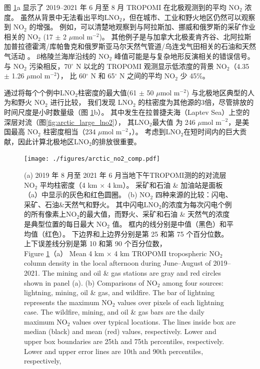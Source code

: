 图 \ref{fig:arctic_no2_comp}a 显示了 2019--2021 年 6 月至 8 月 TROPOMI 在北极观测到的平均 NO$_2$ 浓度。
虽然从背景中无法看出平均LNO$_2$，但在城市、工业和野火地区仍然可以观察到 NO$_2$ 的增强。
例如，可以清楚地观察到与阿拉斯加、挪威和俄罗斯的采矿作业相关的 NO$_2$ (17 $\pm$ 2 $\mu$mol m$^{-2}$)。
其他例子是与加拿大北极麦肯齐谷、北阿拉斯加普拉德霍湾/库帕鲁克和俄罗斯亚马尔天然气管道/乌连戈气田相关的石油和天然气活动 \citep{VanDerA.2020}。
ß格陵兰海岸沿线的 NO$_2$ 峰值可能是与复杂地形反演相关的错误信号\citep{Hachmeister.2022}。
与 NO$_2$ 污染相反，70$^{\circ}$ N 以北的 TROPOMI 观测显示低浓度的背景 NO$_2$（4.35 $\pm$ 1.26 $\mu$mol m$^{-2}$），
比 60$^{\circ}$ N 和 65$^{\circ}$ N 之间的平均 NO$_2$ 少 45\%。

通过将每个个例中LNO$_2$柱密度的最大值(61 $\pm$ 50 $\mu$mol m$^{-2}$) 与北极地区典型的人为和野火 NO$_2$ 进行比较，
我们发现 LNO$_2$ 的柱密度为其他源的3倍，尽管排放的时间尺度是小时数量级（图 \ref{fig:arctic_no2_comp}b）。
其中发生在拉普捷夫海（Laptev Sea）上空的深层对流（图\ref{fig:arctic_large_lno2}），
其LNO$_2$最大值 为 246 $\mu$mol m$^{-2}$，是美国最高 NO$_2$ 柱密度相当（234 $\mu$mol m$^{-2}$，\citet{Goldberg.2021a}）。
考虑到LNO$_2$在短时间内的巨大贡献，因此计算北极地区LNO$_2$的排放很重要。

\begin{figure}[!htbp]
\centering
\texttt{[image: ./figures/arctic\_no2\_comp.pdf]}
\caption{
(a) 2019 年 8 月至 2021 年 6 月当地下午TROPOMI测的的对流层 NO$_2$ 平均柱密度（4 km $\times$ 4 km）。
采矿和石油 \& 加油站是面板（a）中显示的灰色和红色圆圈。
(b) NO$_2$ 四种来源的比较：闪电、采矿、石油\&天然气和野火。
其中闪电LNO$_2$的浓度为每次闪电个例的所有像素上NO$_2$的最大值，而野火、采矿和石油 \& 天然气的浓度是典型位置的每日最大 NO$_2$ 值。
框内的线分别是中值（黑色）和平均值（红色）。
下边界和上边界分别是第 25 和第 75 个百分位数。
上下误差线分别是第 10 和第 90 个百分位数，\\
Figure \ref{fig:arctic_no2_comp}（a） Mean 4 km $\times$ 4 km TROPOMI tropospheric NO$_2$ column density in the local afternoon during June--August of 2019--2021.
The mining and oil \& gas stations are gray and red circles shown in panel (a).
(b) Comparisons of NO$_2$ among four sources: lightning, mining, oil \& gas, and wildfire.
The bar of lightning represents the maximum NO$_2$ values over pixels of each lightning case.
The wildfire, mining, and oil \& gas bars are the daily maximum NO$_2$ values over typical locations.
The lines inside box are median (black) and mean (red) values, respectively.
Lower and upper box boundaries are 25th and 75th percentiles, respectively.
Lower and upper error lines are 10th and 90th percentiles, respectively,
}
\label{fig:arctic_no2_comp}
\end{figure}


